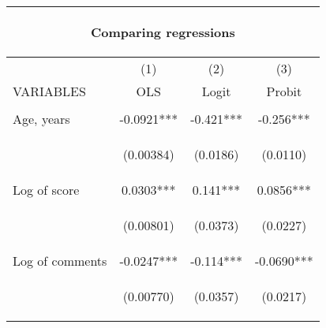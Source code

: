 \begin{center}
\begin{tabular}{lccc}
\multicolumn{4}{c}{\begin{large}Comparing regressions\end{large}} \\ \hline
 & (1) & (2) & (3) \\
VARIABLES & OLS & Logit & Probit \\ \hline
\vspace{4pt} & \begin{footnotesize}\end{footnotesize} & \begin{footnotesize}\end{footnotesize} & \begin{footnotesize}\end{footnotesize} \\
Age, years & -0.0921*** & -0.421*** & -0.256*** \\
\vspace{4pt} & \begin{footnotesize}(0.00384)\end{footnotesize} & \begin{footnotesize}(0.0186)\end{footnotesize} & \begin{footnotesize}(0.0110)\end{footnotesize} \\
Log of score & 0.0303*** & 0.141*** & 0.0856*** \\
\vspace{4pt} & \begin{footnotesize}(0.00801)\end{footnotesize} & \begin{footnotesize}(0.0373)\end{footnotesize} & \begin{footnotesize}(0.0227)\end{footnotesize} \\
Log of comments & -0.0247*** & -0.114*** & -0.0690*** \\
\vspace{4pt} & \begin{footnotesize}(0.00770)\end{footnotesize} & \begin{footnotesize}(0.0357)\end{footnotesize} & \begin{footnotesize}(0.0217)\end{footnotesize} \\

\end{tabular}
\end{center}

